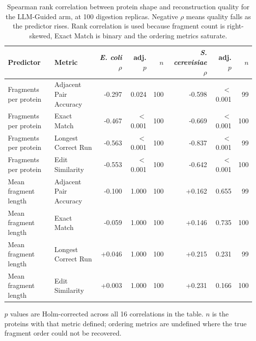 \begin{table}[!tb]
  \centering
  \caption{Spearman rank correlation between protein shape and reconstruction quality for the LLM-Guided arm, at 100 digestion replicas. Negative $\rho$ means quality falls as the predictor rises. Rank correlation is used because fragment count is right-skewed, Exact Match is binary and the ordering metrics saturate.}
  \label{tab:fragment_correlation}
  \begin{tabular}{llrrrrrr}
    \toprule
    Predictor & Metric & \textit{E. coli} $\rho$ & adj. $p$ & $n$ & \textit{S. cerevisiae} $\rho$ & adj. $p$ & $n$ \\
    \midrule
    Fragments per protein & Adjacent Pair Accuracy & -0.297 & 0.024 & 100 & -0.598 & $<$0.001 & 99 \\
    Fragments per protein & Exact Match & -0.467 & $<$0.001 & 100 & -0.669 & $<$0.001 & 100 \\
    Fragments per protein & Longest Correct Run & -0.563 & $<$0.001 & 100 & -0.837 & $<$0.001 & 99 \\
    Fragments per protein & Edit Similarity & -0.553 & $<$0.001 & 100 & -0.642 & $<$0.001 & 100 \\
    Mean fragment length & Adjacent Pair Accuracy & -0.100 & 1.000 & 100 & +0.162 & 0.655 & 99 \\
    Mean fragment length & Exact Match & -0.059 & 1.000 & 100 & +0.146 & 0.735 & 100 \\
    Mean fragment length & Longest Correct Run & +0.046 & 1.000 & 100 & +0.215 & 0.231 & 99 \\
    Mean fragment length & Edit Similarity & +0.003 & 1.000 & 100 & +0.231 & 0.166 & 100 \\
    \bottomrule
  \end{tabular}
  \par\smallskip\footnotesize{$p$ values are Holm-corrected across all 16 correlations in the table. $n$ is the proteins with that metric defined; ordering metrics are undefined where the true fragment order could not be recovered.}
\end{table}
